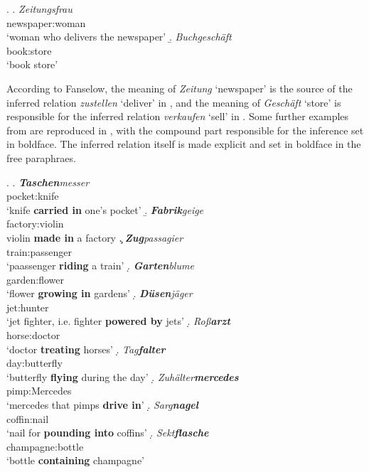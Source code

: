   \ex. \a. \gll
  \emph{Zeitungsfrau}\\
  newspaper:woman \\
  `woman who delivers the newspaper'
  \b. \gll
  \emph{Buchgeschäft}\\
  book:store\\
  `book store'

According to Fanselow, the meaning of \emph{Zeitung} `newspaper' is the source of the inferred relation \emph{zustellen} `deliver' in \Last[a], and the meaning of \emph{Geschäft} `store'  is responsible for the
  inferred relation \emph{verkaufen} `sell' in \Last[b]. Some further examples
  from \citet[156]{Fanselow:1981} are reproduced in \Next, with the compound part responsible for the inference set in boldface. The inferred relation itself is made explicit and set in boldface in the free paraphraes.

  \ex. \label{ex:fanselow_156_stereotpyes}
  \a. \gll
  \emph{\textbf{Taschen}messer}\\
  pocket:knife\\
  `knife \textbf{carried in} one's pocket' %
  \b. \gll
  \emph{\textbf{Fabrik}geige}\\
  factory:violin\\
  violin \textbf{made in} a factory
  \c. \gll
  \emph{\textbf{Zug}passagier}\\
  train:passenger\\
  `paassenger \textbf{riding} a train'
  \d. \gll
  \emph{\textbf{Garten}blume}\\
  garden:flower\\
  `flower \textbf{growing in} gardens'
  \d. \gll
  \emph{\textbf{Düsen}jäger}\\
  jet:hunter\\
  `jet fighter, i.e. fighter \textbf{powered by} jets'
  \d. \gll
  \emph{Roß\textbf{arzt}}\\
  horse:doctor\\
  `doctor \textbf{treating} horses'
  \d. \gll
  \emph{Tag\textbf{falter}}\\
  day:butterfly\\
  `butterfly \textbf{flying} during the day'
  \d. \gll
  \emph{Zuhälter\textbf{mercedes}}\\
  pimp:Mercedes\\
  `mercedes that pimps \textbf{drive in}'
  \d. \gll
  \emph{Sarg\textbf{nagel}}\\
  coffin:nail\\
  `nail for \textbf{pounding into} coffins' %
  \d. \gll
  \emph{Sekt\textbf{flasche}}\\
  champagne:bottle\\
  `bottle \textbf{containing} champagne'
  
